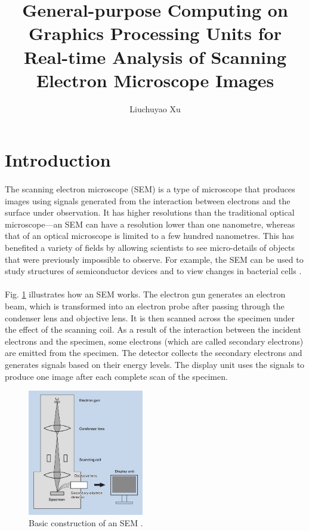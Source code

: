 \documentclass[12pt, twocolumn]{report}
\author{Liuchuyao Xu}
\title{General-purpose Computing on Graphics Processing Units for Real-time Analysis of Scanning Electron Microscope Images}
\begin{document}
\maketitle

\begin{abstract}
\end{abstract}

\section{Introduction}
\paragraph{}
The scanning electron microscope (SEM) is a type of microscope that produces images using signals generated from the interaction between electrons and the surface under observation. It has higher resolutions than the traditional optical microscope---an SEM can have a resolution lower than one nanometre, whereas that of an optical microscope is limited to a few hundred nanometres. This has benefited a variety of fields by allowing scientists to see micro-details of objects that were previously impossible to observe. For example, the SEM can be used to study structures of semiconductor devices \cite{SEM for semiconductors} and to view changes in bacterial cells \cite{SEM for baterial cells}.

\paragraph{}
Fig. \ref{SEM basic construction} illustrates how an SEM works. The electron gun generates an electron beam, which is transformed into an electron probe after passing through the condenser lens and objective lens. It is then scanned across the specimen under the effect of the scanning coil. As a result of the interaction between the incident electrons and the specimen, some electrons (which are called secondary electrons) are emitted from the specimen. The detector collects the secondary electrons and generates signals based on their energy levels. The display unit uses the signals to produce one image after each complete scan of the specimen.

\begin{figure}[htbp]
    \centering
    \includegraphics[width=0.45\textwidth]{Figures/SEM basic construction.jpg}
    \caption{Basic construction of an SEM \cite{SEM A to Z}.}
    \label{SEM basic construction}
\end{figure}
\end{document}
